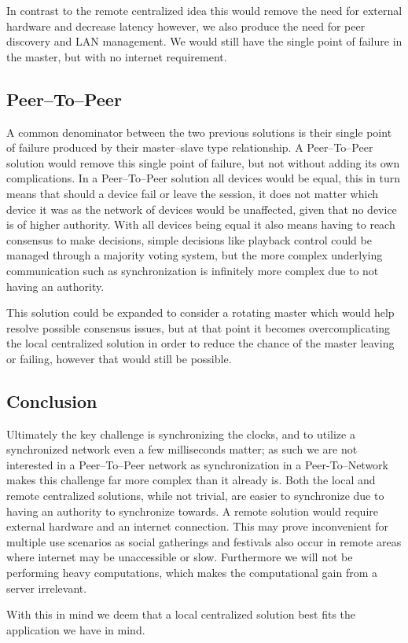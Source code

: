 In contrast to the remote centralized idea this would remove the need for external hardware and decrease latency however, we also produce the need for peer discovery and LAN management.
We would still have the single point of failure in the master, but with no internet requirement.

\subsection{Peer--To--Peer}
A common denominator between the two previous solutions is their single point of failure produced by their master--slave type relationship.
A Peer--To--Peer solution would remove this single point of failure, but not without adding its own complications.
In a Peer--To--Peer solution all devices would be equal, this in turn means that should a device fail or leave the session, it does not matter which device it was as the network of devices would be unaffected, given that no device is of higher authority.
With all devices being equal it also means having to reach consensus to make decisions, simple decisions like playback control could be managed through a majority voting system, but the more complex underlying communication such as synchronization is infinitely more complex due to not having an authority.

This solution could be expanded to consider a rotating master which would help resolve possible consensus issues, but at that point it becomes overcomplicating the local centralized solution in order to reduce the chance of the master leaving or failing, however that would still be possible.

\subsection{Conclusion}
Ultimately the key challenge is synchronizing the clocks, and to utilize a synchronized network even a few milliseconds matter; as such we are not interested in a Peer--To--Peer network as synchronization in a Peer-To--Network makes this challenge far more complex than it already is.
Both the local and remote centralized solutions, while not trivial, are easier to synchronize due to having an authority to synchronize towards.
A remote solution would require external hardware and an internet connection.
This may prove inconvenient for multiple use scenarios as social gatherings and festivals also occur in remote areas where internet may be unaccessible or slow. 
Furthermore we will not be performing heavy computations, which makes the computational gain from a server irrelevant.

With this in mind we deem that a local centralized solution best fits the application we have in mind. 
